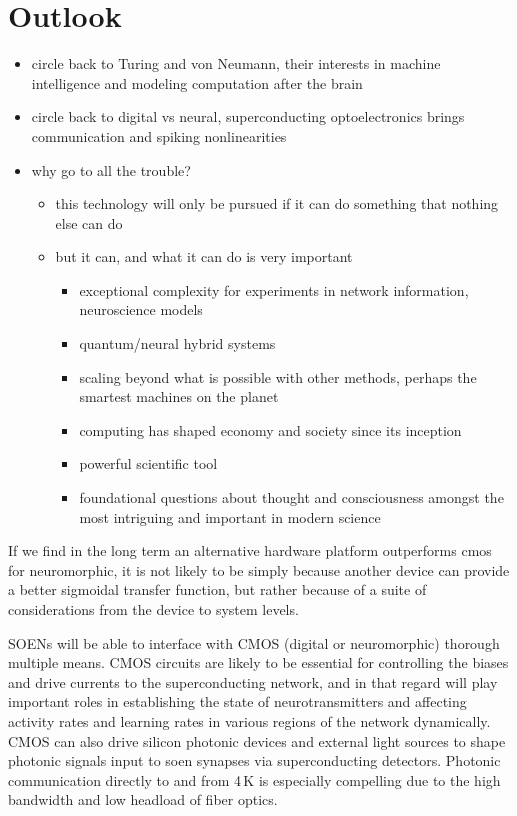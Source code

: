 \section{\label{sec:outlook}Outlook}

\begin{itemize}

\item circle back to Turing and von Neumann, their interests in machine intelligence and modeling computation after the brain
\item circle back to digital vs neural, superconducting optoelectronics brings communication and spiking nonlinearities

\item why go to all the trouble?
\begin{itemize}
\item this technology will only be pursued if it can do something that nothing else can do
\item but it can, and what it can do is very important
\begin{itemize}
\item exceptional complexity for experiments in network information, neuroscience models
\item quantum/neural hybrid systems
\item scaling beyond what is possible with other methods, perhaps the smartest machines on the planet
\item computing has shaped economy and society since its inception
\item powerful scientific tool
\item foundational questions about thought and consciousness amongst the most intriguing and important in modern science
\end{itemize}

\end{itemize}

\end{itemize}

\vspace{3em}
If we find in the long term an alternative hardware platform outperforms cmos for neuromorphic, it is not likely to be simply because another device can provide a better sigmoidal transfer function, but rather because of a suite of considerations from the device to system levels.

SOENs will be able to interface with CMOS (digital or neuromorphic) thorough multiple means. CMOS circuits are likely to be essential for controlling the biases and drive currents to the superconducting network, and in that regard will play important roles in establishing the state of neurotransmitters and affecting activity rates and learning rates in various regions of the network dynamically. CMOS can also drive silicon photonic devices and external light sources to shape photonic signals input to soen synapses via superconducting detectors. Photonic communication directly to and from 4\,K is especially compelling due to the high bandwidth and low headload of fiber optics. 

